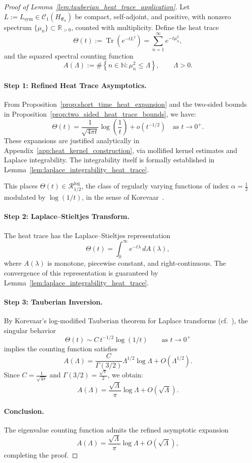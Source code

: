 \begin{proof}[Proof of Lemma~\ref{lem:tauberian_heat_trace_application}]
Let \( L := L_{\mathrm{sym}} \in \mathcal{C}_1(H_{\Psi_\alpha}) \) be compact, self-adjoint, and positive, with nonzero spectrum \( \{ \mu_n \} \subset \mathbb{R}_{>0} \), counted with multiplicity. Define the heat trace
\[
\Theta(t) := \operatorname{Tr}(e^{-t L^2}) = \sum_{n=1}^\infty e^{-t \mu_n^2},
\]
and the squared spectral counting function
\[
A(\Lambda) := \#\left\{ n \in \mathbb{N} : \mu_n^2 \le \Lambda \right\}, \qquad \Lambda > 0.
\]

\paragraph{Step 1: Refined Heat Trace Asymptotics.}
From Proposition~\ref{prop:short_time_heat_expansion} and the two-sided bounds in Proposition~\ref{prop:two_sided_heat_trace_bounds}, we have:
\[
\Theta(t) = \frac{1}{\sqrt{4\pi t}} \log\left( \frac{1}{t} \right) + o(t^{-1/2}) \quad \text{as } t \to 0^+.
\]
These expansions are justified analytically in Appendix~\ref{app:heat_kernel_construction}, via mollified kernel estimates and Laplace integrability. The integrability itself is formally established in Lemma~\ref{lem:laplace_integrability_heat_trace}.

This places \( \Theta(t) \in \mathcal{R}_{1/2}^{\log} \), the class of regularly varying functions of index \( \alpha = \tfrac{1}{2} \) modulated by \( \log(1/t) \), in the sense of Korevaar~\cite[Ch.~III, §5]{Korevaar2004Tauberian}.

\paragraph{Step 2: Laplace–Stieltjes Transform.}
The heat trace has the Laplace–Stieltjes representation
\[
\Theta(t) = \int_0^\infty e^{-t \lambda} \, dA(\lambda),
\]
where \( A(\lambda) \) is monotone, piecewise constant, and right-continuous. The convergence of this representation is guaranteed by Lemma~\ref{lem:laplace_integrability_heat_trace}.

\paragraph{Step 3: Tauberian Inversion.}
By Korevaar’s log-modified Tauberian theorem for Laplace transforms (cf.~\cite[Thm.~5.5]{Korevaar2004Tauberian}), the singular behavior
\[
\Theta(t) \sim C \, t^{-1/2} \log(1/t) \qquad \text{as } t \to 0^+
\]
implies the counting function satisfies
\[
A(\Lambda) = \frac{C}{\Gamma(3/2)} \Lambda^{1/2} \log \Lambda + O(\Lambda^{1/2}).
\]
Since \( C = \frac{1}{\sqrt{4\pi}} \) and \( \Gamma(3/2) = \frac{\sqrt{\pi}}{2} \), we obtain:
\[
A(\Lambda) = \frac{\sqrt{\Lambda}}{\pi} \log \Lambda + O(\sqrt{\Lambda}).
\]

\paragraph{Conclusion.}
The eigenvalue counting function admits the refined asymptotic expansion
\[
A(\Lambda) = \frac{\sqrt{\Lambda}}{\pi} \log \Lambda + O(\sqrt{\Lambda}),
\]
completing the proof.
\end{proof}
